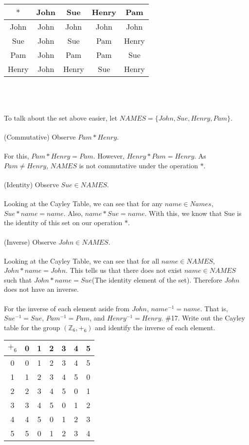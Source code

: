 \documentclass[11pt]{amsart}
\begin{document}
\begin{tabular}{c | c  c  c  c }
$\ast$ & John & Sue & Henry & Pam\\
\hline
John & John & John & John & John \\

Sue & John & Sue & Pam & Henry \\

Pam & John & Pam & Pam & Sue \\

Henry & John & Henry & Sue & Henry\\
\end{tabular}
\\
\\
\\To talk about the set above easier, let $NAMES=\{ John, Sue, Henry, Pam\}$.\\
\\(Commutative) Observe $Pam\ast Henry$. 
\\
\\For this, $Pam\ast Henry=Pam$. However, $Henry\ast Pam=Henry$. As $Pam\neq Henry$, $NAMES$ is not commutative under the operation $\ast$.
\\
\\(Identity) Observe $Sue\in NAMES$.
\\
\\Looking at the Cayley Table, we can see that for any $name\in Names$, $Sue\ast name=name$. Also, $name\ast Sue=name$. With this, we know that Sue is the identity of this set on our operation $\ast$. 
\\
\\(Inverse) Observe $John\in NAMES$.
\\
\\Looking at the Cayley Table, we can see that for all $name\in NAMES$, $John\ast name={John}$. This tells us that there does not exist $name\in NAMES$ such that $John\ast name=Sue$(The identity element of the set). Therefore $John$ does not have an inverse.
\\
\\For the inverse of each element aside from $John$, $name^{-1}=name$. That is, $Sue^{-1}=Sue$, $Pam^{-1}=Pam$, and $Henry^{-1}=Henry$.
\vskip 3in
\#17.  Write out the Cayley table for the group $(\mathbb{Z}_6, +_6)$ and identify the inverse of each element.\\
\vskip 0.1in
\begin{tabular}{c | c  c  c  c  c  c }
	$+_{6}$ & 0 & 1 & 2 & 3 & 4 & 5 \\
	\hline
		0 & 0 & 1 & 2 & 3 & 4 & 5 \\
	
		1 & 1 & 2 & 3 & 4 & 5 & 0 \\
	
		2 & 2 & 3 & 4 & 5 & 0 & 1 \\
	
		3 & 3 & 4 & 5 & 0 & 1 & 2 \\
		
		4 & 4 & 5 & 0 & 1 & 2 & 3 \\
		
		5 & 5 & 0 & 1 & 2 & 3 & 4 \\
\end{tabular}
\end{document}
